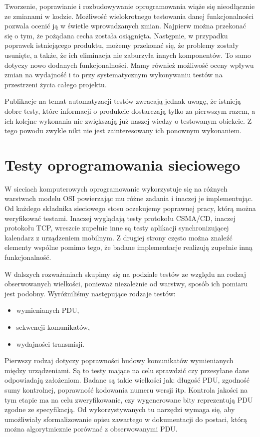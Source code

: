 \documentclass[00-praca-magisterska.tex]{subfiles}
\begin{document}
Tworzenie, poprawianie i rozbudowywanie oprogramowania wiąże się nieodłącznie
ze zmianami w kodzie. Możliwość wielokrotnego testowania danej funkcjonalności
pozwala ocenić ją w świetle wprowadzanych zmian. Najpierw można przekonać się o
tym, że pożądana cecha została osiągnięta. Następnie, w przypadku poprawek
istniejącego produktu, możemy przekonać się, że problemy zostały usunięte, a
także, że ich eliminacja nie zaburzyła innych komponentów. To samo dotyczy nowo
dodanych funkcjonalności. Mamy również możliwość oceny wpływu zmian na
wydajność i to przy systematycznym wykonywaniu testów na przestrzeni życia
całego projektu.

Publikacje na temat automatyzacji testów \cite{good-test,snake-oil} zwracają
jednak uwagę, że istnieją dobre testy, które informacji o produkcie dostarczają
tylko za pierwszym razem, a ich kolejne wykonania nie zwiększają już naszej
wiedzy o testowanym obiekcie. Z tego powodu zwykle nikt nie jest zainteresowany
ich ponownym wykonaniem.

\section{Testy oprogramowania sieciowego}
\label{testy-aplikacji-sieciowych}

W sieciach komputerowych oprogramowanie wykorzystuje się na różnych warstwach
modelu OSI powierzając mu różne zadania i inaczej je implementując. Od każdego
składnika sieciowego stosu oczekujemy poprawnej pracy, którą można weryfikować
testami. Inaczej wyglądają testy protokołu CSMA/CD, inaczej protokołu TCP,
wreszcie zupełnie inne są testy aplikacji synchronizującej kalendarz z
urządzeniem mobilnym. Z drugiej strony często można znaleźć elementy wspólne
pomimo tego, że badane implementacje realizują zupełnie inną funkcjonalność.

W dalszych rozważaniach skupimy się na podziale testów ze względu na rodzaj
obserwowanych wielkości, ponieważ niezależnie od warstwy, sposób ich pomiaru
jest podobny. Wyróżniliśmy następujące rodzaje testów:
\begin{itemize}
  \item wymienianych PDU,
  \item sekwencji komunikatów,
  \item wydajności transmisji.
\end{itemize}

Pierwszy rodzaj dotyczy poprawności budowy komunikatów wymienianych między
urządzeniami. Są to testy mające na celu sprawdzić czy przesyłane dane
odpowiadają założeniom.  Badane są takie wielkości jak: długość PDU, zgodność
sumy kontrolnej, poprawność kodowania numeru wersji itp. Kontrola jakości na
tym etapie ma na celu zweryfikowanie, czy wygenerowane bity reprezentują PDU
zgodne ze specyfikacją. Od wykorzystywanych tu narzędzi wymaga się, aby
umożliwiały sformalizowanie opisu zawartego w dokumentacji do postaci, którą
można algorytmicznie porównać z obserwowanymi PDU.
\end{document}
